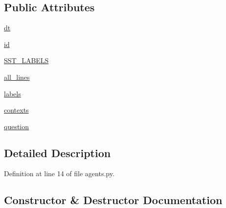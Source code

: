 \subsection*{Public Attributes}
\begin{DoxyCompactItemize}
\item 
\hyperlink{classparlai_1_1tasks_1_1sst_1_1agents_1_1SSTTeacher_a6569a040ff7272f78becaf53b50758df}{dt}
\item 
\hyperlink{classparlai_1_1tasks_1_1sst_1_1agents_1_1SSTTeacher_a620fc9e36feee1916bec41e01449421b}{id}
\item 
\hyperlink{classparlai_1_1tasks_1_1sst_1_1agents_1_1SSTTeacher_aae023784a28998142cbaac66d9ebb1ff}{S\+S\+T\+\_\+\+L\+A\+B\+E\+LS}
\item 
\hyperlink{classparlai_1_1tasks_1_1sst_1_1agents_1_1SSTTeacher_a555e131fc76d2c8b1ac08171f677e969}{all\+\_\+lines}
\item 
\hyperlink{classparlai_1_1tasks_1_1sst_1_1agents_1_1SSTTeacher_ab9c4dcb4b8b2b2e753dc53400bd4fdd9}{labels}
\item 
\hyperlink{classparlai_1_1tasks_1_1sst_1_1agents_1_1SSTTeacher_aec692483a930bc8463105457142ef84b}{contexts}
\item 
\hyperlink{classparlai_1_1tasks_1_1sst_1_1agents_1_1SSTTeacher_a8c33e7285f005f10ada92d3207d61399}{question}
\end{DoxyCompactItemize}


\subsection{Detailed Description}


Definition at line 14 of file agents.\+py.



\subsection{Constructor \& Destructor Documentation}
\mbox{\label{classparlai_1_1tasks_1_1sst_1_1agents_1_1SSTTeacher_ad16c8f7acfe2dde86cc77eb9047c465f}} 
